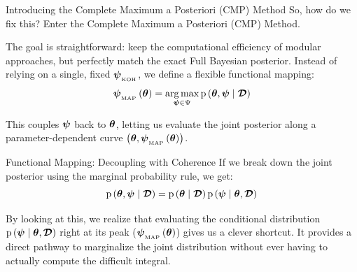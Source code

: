\begin{frame}{Introducing the Complete Maximum a Posteriori (CMP) Method}
    So, how do we fix this? Enter the Complete Maximum a Posteriori (CMP) Method.
    \vspace{0.3cm}
    
    The goal is straightforward: keep the computational efficiency of modular approaches, but perfectly match the exact Full Bayesian posterior. Instead of relying on a single, fixed $\boldsymbol{\psi}_{_\text{KOH}}$, we define a flexible functional mapping:
    \begin{equation*}
        \boldsymbol{\psi}_{_\text{MAP}} \left( \boldsymbol{\theta} \right) = \operatorname*{arg\,max}_{\boldsymbol{\psi} \in \Psi} \text{p} \left( \boldsymbol{\theta}, \boldsymbol{\psi} \mid \boldsymbol{\mathcal{D}} \right)
    \end{equation*}
    
    This couples $\boldsymbol{\psi}$ back to $\boldsymbol{\theta}$, letting us evaluate the joint posterior along a parameter-dependent curve $\left(\boldsymbol{\theta}, \boldsymbol{\psi}_{_\text{MAP}} \left( \boldsymbol{\theta} \right)\right)$.
\end{frame}

\begin{frame}{Functional Mapping: Decoupling with Coherence}
    If we break down the joint posterior using the marginal probability rule, we get:
    \begin{equation*}
        \text{p} \left( \boldsymbol{\theta}, \boldsymbol{\psi} \mid \boldsymbol{\mathcal{D}} \right) = \text{p} \left( \boldsymbol{\theta} \mid \boldsymbol{\mathcal{D}} \right) \text{p} \left( \boldsymbol{\psi} \mid \boldsymbol{\theta}, \boldsymbol{\mathcal{D}} \right)
    \end{equation*}
    
    \vspace{0.5cm}
    By looking at this, we realize that evaluating the conditional distribution $\text{p} \left( \boldsymbol{\psi} \mid \boldsymbol{\theta}, \boldsymbol{\mathcal{D}} \right)$ right at its peak ($\boldsymbol{\psi}_{_\text{MAP}} \left( \boldsymbol{\theta} \right)$) gives us a clever shortcut. It provides a direct pathway to marginalize the joint distribution without ever having to actually compute the difficult integral.
\end{frame}

